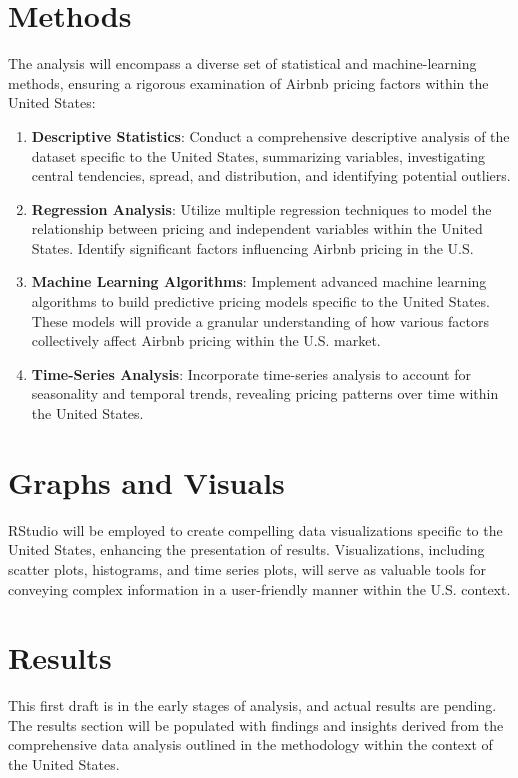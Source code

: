 \documentclass[12pt, letterpaper]{article}
\begin{document}
\section*{Methods}
The analysis will encompass a diverse set of statistical and machine-learning methods, ensuring a rigorous examination of Airbnb pricing factors within the United States:

\begin{enumerate}
  \item \textbf{Descriptive Statistics}: Conduct a comprehensive descriptive analysis of the dataset specific to the United States, summarizing variables, investigating central tendencies, spread, and distribution, and identifying potential outliers.
  \item \textbf{Regression Analysis}: Utilize multiple regression techniques to model the relationship between pricing and independent variables within the United States. Identify significant factors influencing Airbnb pricing in the U.S.
  \item \textbf{Machine Learning Algorithms}: Implement advanced machine learning algorithms to build predictive pricing models specific to the United States. These models will provide a granular understanding of how various factors collectively affect Airbnb pricing within the U.S. market.
  \item \textbf{Time-Series Analysis}: Incorporate time-series analysis to account for seasonality and temporal trends, revealing pricing patterns over time within the United States.
\end{enumerate}

\section*{Graphs and Visuals}
RStudio will be employed to create compelling data visualizations specific to the United States, enhancing the presentation of results. Visualizations, including scatter plots, histograms, and time series plots, will serve as valuable tools for conveying complex information in a user-friendly manner within the U.S. context.

\section*{Results}
This first draft is in the early stages of analysis, and actual results are pending. The results section will be populated with findings and insights derived from the comprehensive data analysis outlined in the methodology within the context of the United States.
\end{document}

